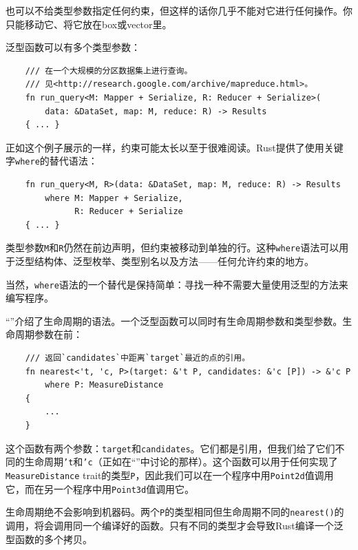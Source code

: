 也可以不给类型参数指定任何约束，但这样的话你几乎不能对它进行任何操作。你只能移动它、将它放在box或vector里。

泛型函数可以有多个类型参数：
\begin{verbatim}
    /// 在一个大规模的分区数据集上进行查询。
    /// 见<http://research.google.com/archive/mapreduce.html>。
    fn run_query<M: Mapper + Serialize, R: Reducer + Serialize>(
        data: &DataSet, map: M, reduce: R) -> Results
    { ... }
\end{verbatim}

正如这个例子展示的一样，约束可能太长以至于很难阅读。Rust提供了使用关键字\texttt{where}的替代语法：
\begin{verbatim}
    fn run_query<M, R>(data: &DataSet, map: M, reduce: R) -> Results
        where M: Mapper + Serialize,
              R: Reducer + Serialize
    { ... }
\end{verbatim}

类型参数\texttt{M}和\texttt{R}仍然在前边声明，但约束被移动到单独的行。这种\texttt{where}语法可以用于泛型结构体、泛型枚举、类型别名以及方法——任何允许约束的地方。

当然，\texttt{where}语法的一个替代是保持简单：寻找一种不需要大量使用泛型的方法来编写程序。

“”介绍了生命周期的语法。一个泛型函数可以同时有生命周期参数和类型参数。生命周期参数在前：
\begin{verbatim}
    /// 返回`candidates`中距离`target`最近的点的引用。
    fn nearest<'t, 'c, P>(target: &'t P, candidates: &'c [P]) -> &'c P
        where P: MeasureDistance
    {
        ...
    }
\end{verbatim}

这个函数有两个参数：\texttt{target}和\texttt{candidates}。它们都是引用，但我们给了它们不同的生命周期\texttt{'t}和\texttt{'c}（正如在“”中讨论的那样）。这个函数可以用于任何实现了\texttt{MeasureDistance} trait的类型\texttt{P}，因此我们可以在一个程序中用\texttt{Point2d}值调用它，而在另一个程序中用\texttt{Point3d}值调用它。

生命周期绝不会影响到机器码。两个\texttt{P}的类型相同但生命周期不同的\texttt{nearest()}的调用，将会调用同一个编译好的函数。只有不同的类型才会导致Rust编译一个泛型函数的多个拷贝。

